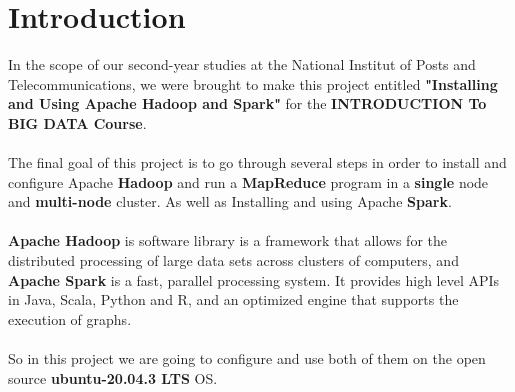 \chapter*{Introduction}
\begin{spacing}{1.5}
\Large In the scope of our second-year studies at the National Institut of Posts and Telecommunications, we were brought to make this project entitled \textbf{"Installing and Using Apache Hadoop and Spark"} for the \textbf{INTRODUCTION To BIG DATA Course}.
\\\\
The final goal of this project is to go through several steps in order to install and configure Apache \textbf{Hadoop} and run a \textbf{MapReduce} program in a \textbf{single} node and \textbf{multi-node} cluster. As well as Installing and using Apache \textbf{Spark}.
\\\\
\textbf{Apache Hadoop} is software library is a framework that allows for the distributed processing of large data sets across clusters of computers, and \textbf{Apache Spark} is a fast, parallel processing system. It provides high level APIs in Java, Scala, Python and R, and an optimized engine that supports the execution of graphs. 
\\\\
So in this project we are going to configure and use both of them on the open source \textbf{ubuntu-20.04.3 LTS} OS. \\ 


\end{spacing}

\makeatletter
\renewcommand{\thesection}{\@arabic\c@section}
\makeatother
